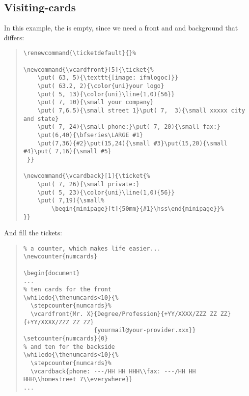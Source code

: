 \documentclass[a4paper,KOMA,landscape]{powersem}
\newcommand{\ticket}{{\code{ticket.sty}}}
\newcommand{\bs}{{\mtt\\}}
\begin{document}
\begin{slide}\vspace*{-4mm}
\subsection{Visiting-cards}
In this example, the \code{\bs{}ticketdefault} is empty, since we need a front and and background that differs:
\begin{quote}
    \begin{minipage}[t]{0.5\textwidth}
      {\scriptsize
\begin{verbatim}
\renewcommand{\ticketdefault}{}%

\newcommand{\vcardfront}[5]{\ticket{%
    \put( 63, 5){\texttt{[image: ifmlogoc]}}
    \put( 63.2, 2){\color{uni}your logo}
    \put( 5, 13){\color{uni}\line(1,0){56}}
    \put( 7, 10){\small your company}
    \put( 7,6.5){\small street 1}\put( 7,  3){\small xxxxx city and state}
    \put( 7, 24){\small phone:}\put( 7, 20){\small fax:}
    \put(6,40){\bfseries\LARGE #1}
    \put(7,36){#2}\put(15,24){\small #3}\put(15,20){\small #4}\put( 7,16){\small #5}
 }}

\newcommand{\vcardback}[1]{\ticket{%
    \put( 7, 26){\small private:}
    \put( 5, 23){\color{uni}\line(1,0){56}}
    \put( 7,19){\small%
        \begin{minipage}[t]{50mm}{#1}\hss\end{minipage}}%
}}
\end{verbatim}
        }
    \end{minipage}
\end{quote}
\end{slide}
\begin{slide}\vspace*{10mm}
And fill the tickets:
\begin{quote}
    \begin{minipage}[t]{0.5\textwidth}
      {\scriptsize
\begin{verbatim}
% a counter, which makes life easier...
\newcounter{numcards}

\begin{document}
...
% ten cards for the front
\whiledo{\thenumcards<10}{%
  \stepcounter{numcards}%
  \vcardfront{Mr. X}{Degree/Profession}{+YY/XXXX/ZZZ ZZ ZZ}{+YY/XXXX/ZZZ ZZ ZZ}
                    {yourmail@your-provider.xxx}}
\setcounter{numcards}{0}
% and ten for the backside
\whiledo{\thenumcards<10}{%
  \stepcounter{numcards}%
  \vcardback{phone: ---/HH HH HHH\\fax: ---/HH HH HHH\\homestreet 7\\everywhere}}
...
\end{verbatim}
        }
    \end{minipage}
\end{quote}
\end{slide}
\end{document}
